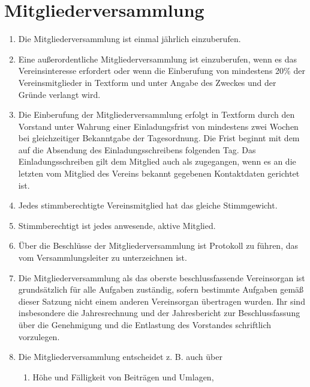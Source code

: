 \documentclass[a4paper,ngerman]{scrartcl}
\begin{document}
\section{Mitgliederversammlung}
\begin{enumerate}
\item Die Mitgliederversammlung ist einmal jährlich einzuberufen.
\item Eine außerordentliche Mitgliederversammlung ist einzuberufen, wenn es das Vereinsinteresse erfordert oder wenn die Einberufung von mindestens 20\% der Vereinsmitglieder in Textform und unter Angabe des Zweckes und der Gründe verlangt wird.
\item Die Einberufung der Mitgliederversammlung erfolgt in Textform durch den Vorstand unter Wahrung einer Einladungsfrist von mindestens zwei Wochen bei gleichzeitiger Bekanntgabe der Tagesordnung. Die Frist beginnt mit dem auf die Absendung des Einladungsschreibens folgenden Tag. Das Einladungsschreiben gilt dem Mitglied auch als zugegangen, wenn es an die letzten vom Mitglied des Vereins bekannt gegebenen Kontaktdaten gerichtet ist.
\item Jedes stimmberechtigte Vereinsmitglied hat das gleiche Stimmgewicht.
\item Stimmberechtigt ist jedes anwesende, aktive Mitglied.
\item Über die Beschlüsse der Mitgliederversammlung ist Protokoll zu führen, das vom Versammlungsleiter zu unterzeichnen ist.
\item Die Mitgliederversammlung als das oberste beschlussfassende Vereinsorgan ist grundsätzlich für alle Aufgaben zuständig, sofern bestimmte Aufgaben gemäß dieser Satzung nicht einem anderen Vereinsorgan übertragen wurden. Ihr sind insbesondere die Jahresrechnung und der Jahresbericht zur Beschlussfassung über die Genehmigung und die Entlastung des Vorstandes schriftlich vorzulegen.
\item Die Mitgliederversammlung entscheidet z. B. auch über
\begin{enumerate}
\item Höhe und Fälligkeit von Beiträgen und Umlagen,

\end{enumerate}
\end{enumerate}
\end{document}
